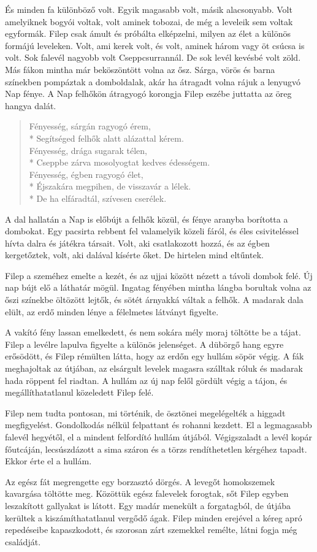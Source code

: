\documentclass[10pt]{memoir}
\newcommand{\napdal}{
  Fényesség, sárgán ragyogó érem, \\*
  Segítséged felhők alatt alázattal kérem. \\
  Fényesség, drága sugarak télen, \\*
  Cseppbe zárva mosolyogtat kedves édességem. \\
  Fényesség, égben ragyogó élet, \\*
  Éjszakára megpihen, de visszavár a lélek. \\*
  De ha elfáradtál, szívesen cserélek.
}
\begin{document}
És minden fa különböző volt. Egyik magasabb volt, másik alacsonyabb. Volt
amelyiknek bogyói voltak, volt aminek tobozai, de még a leveleik sem voltak
egyformák. Filep csak ámult és próbálta elképzelni, milyen az élet a különös
formájú leveleken. Volt, ami kerek volt, és volt, aminek három vagy öt csúcsa
is volt. Sok falevél nagyobb volt Cseppcsurrannál. De sok levél kevésbé volt
zöld. Más fákon mintha már beköszöntött volna az ősz. Sárga, vörös és barna
színekben pompáztak a domboldalak, akár ha átragadt volna rájuk a lenyugvó Nap
fénye. A Nap felhőkön átragyogó korongja Filep eszébe juttatta az öreg hangya
dalát.

\begin{verse}
\napdal
\end{verse}

A dal hallatán a Nap is előbújt a felhők közül, és fénye aranyba borította a
dombokat. Egy pacsirta rebbent fel valamelyik közeli fáról, és éles
csiviteléssel hívta dalra és játékra társait. Volt, aki csatlakozott hozzá, és
az égben kergetőztek, volt, aki dalával kísérte őket. De hirtelen mind
eltűntek.

Filep a szeméhez emelte a kezét, és az ujjai között nézett a távoli dombok
felé. Új nap bújt elő a láthatár mögül. Ingatag fényében mintha lángba borultak
volna az őszi színekbe öltözött lejtők, és sötét árnyakká váltak a felhők. A
madarak dala elült, az erdő minden lénye a félelmetes látványt figyelte.

A vakító fény lassan emelkedett, és nem sokára mély moraj töltötte be a tájat.
Filep a levélre lapulva figyelte a különös jelenséget. A dübörgő hang egyre
erősödött, és Filep rémülten látta, hogy az erdőn egy hullám söpör végig. A fák
meghajoltak az útjában, az elsárgult levelek magasra szálltak róluk és madarak
hada röppent fel riadtan. A hullám az új nap felől gördült végig a tájon, és
megállíthatatlanul közeledett Filep felé.

Filep nem tudta pontosan, mi történik, de ösztönei megelégelték a higgadt
megfigyelést. Gondolkodás nélkül felpattant és rohanni kezdett. El a
legmagasabb falevél hegyétől, el a mindent felfordító hullám útjából.
Végigszaladt a levél kopár főutcáján, lecsúszdázott a sima száron és a törzs
rendíthetetlen kérgéhez tapadt. Ekkor érte el a hullám.

Az egész fát megrengette egy borzasztó dörgés. A levegőt homokszemek kavargása
töltötte meg. Közöttük egész falevelek forogtak, sőt Filep egyben leszakított
gallyakat is látott. Egy madár menekült a forgatagból, de útjába kerültek a
kiszámíthatatlanul vergődő ágak. Filep minden erejével a kéreg apró repedéseibe
kapaszkodott, és szorosan zárt szemekkel remélte, látni fogja még családját.
\end{document}

